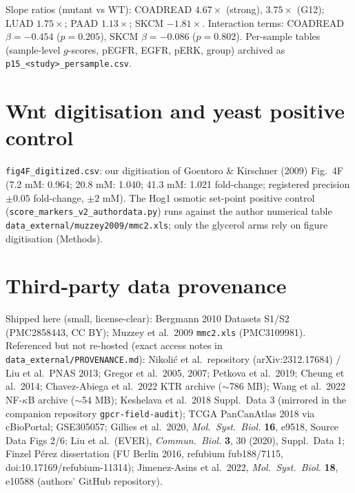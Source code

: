 \documentclass[11pt]{article}
\begin{document}
Slope ratios (mutant vs WT): COADREAD $4.67\times$ (strong), $3.75\times$
(G12); LUAD $1.75\times$; PAAD $1.13\times$; SKCM $-1.81\times$.
Interaction terms: COADREAD $\beta=-0.454$ ($p=0.205$), SKCM
$\beta=-0.086$ ($p=0.802$). Per-sample tables (sample-level $g$-scores,
pEGFR, EGFR, pERK, group) archived as \texttt{p15\_<study>\_persample.csv}.

\section{Wnt digitisation and yeast positive control}

\texttt{fig4F\_digitized.csv}: our digitisation of Goentoro \& Kirschner
(2009) Fig.~4F (7.2 mM: 0.964; 20.8 mM: 1.040; 41.3 mM: 1.021
fold-change; registered precision $\pm 0.05$ fold-change, $\pm 2$ mM).
The Hog1 osmotic set-point positive control
(\texttt{score\_markers\_v2\_authordata.py}) runs against the author
numerical table \texttt{data\_external/muzzey2009/mmc2.xls}; only the
glycerol arms rely on figure digitisation (Methods).

\section{Third-party data provenance}

Shipped here (small, license-clear): Bergmann 2010 Datasets S1/S2
(PMC2858443, CC BY); Muzzey et al.\ 2009 \texttt{mmc2.xls}
(PMC3109981). Referenced but not re-hosted (exact access notes in
\texttt{data\_external/PROVENANCE.md}): Nikoli\'c et al.\ repository
(arXiv:2312.17684) / Liu et al.\ PNAS 2013; Gregor et al.\ 2005, 2007;
Petkova et al.\ 2019; Cheung et al.\ 2014; Chavez-Abiega et al.\ 2022
KTR archive ($\sim$786 MB); Wang et al.\ 2022 NF-$\kappa$B archive
($\sim$54 MB); Keshelava et al.\ 2018 Suppl.\ Data 3 (mirrored in the
companion repository \texttt{gpcr-field-audit}); TCGA PanCanAtlas 2018
via cBioPortal; GSE305057; Gillies et al.\ 2020, \textit{Mol.\ Syst.\
Biol.} \textbf{16}, e9518, Source Data Figs 2/6; Liu et al.\ (EVER),
\textit{Commun.\ Biol.} \textbf{3}, 30 (2020), Suppl.\ Data 1; Finzel
P\'erez dissertation (FU Berlin 2016, refubium fub188/7115,
doi:10.17169/refubium-11314);
Jimenez-Asins et al.\ 2022, \textit{Mol.\ Syst.\ Biol.} \textbf{18},
e10588 (authors' GitHub repository).
\end{document}
